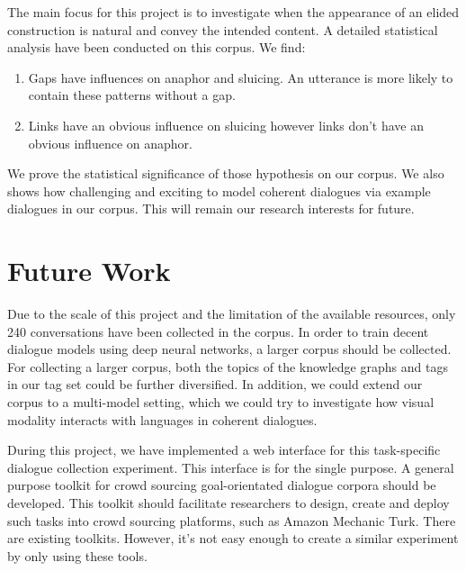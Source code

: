 \documentclass[bsc,frontabs,twoside,singlespacing,parskip,deptreport]{infthesis}     %
\begin{document}
The main focus for this project is to investigate when the appearance of an elided construction is natural and convey the intended content. A detailed statistical analysis have been conducted on this corpus. We find:

\begin{enumerate}
   \item Gaps have influences on anaphor and sluicing. An utterance is more likely to contain these patterns without a gap.

   \item Links have an obvious influence on sluicing however links don’t have an obvious influence on anaphor.
 
\end{enumerate}

We prove the statistical significance of those hypothesis on our corpus. We also shows how challenging and exciting to model coherent dialogues via example dialogues in our corpus. This will remain our research interests for future.

\section{Future Work}

Due to the scale of this project and the limitation of the available resources, only 240 conversations have been collected in the corpus. In order to train decent dialogue models using deep neural networks, a larger corpus should be collected. For collecting a larger corpus, both the topics of the knowledge graphs and tags in our tag set could be further diversified. In addition, we could extend our corpus to a multi-model setting, which we could try to investigate how visual modality interacts with languages in coherent dialogues.

During this project, we have implemented a web interface for this task-specific dialogue collection experiment. This interface is for the single purpose. A general purpose toolkit for crowd sourcing goal-orientated dialogue corpora should be developed. This toolkit should facilitate researchers to design, create and deploy such tasks into crowd sourcing platforms, such as Amazon Mechanic Turk\cite{mturk}. There are existing toolkits\cite{lee2018dialcrowd,miller2017parlai}. However, it's not easy enough to create a similar experiment by only using these tools.
\end{document}
